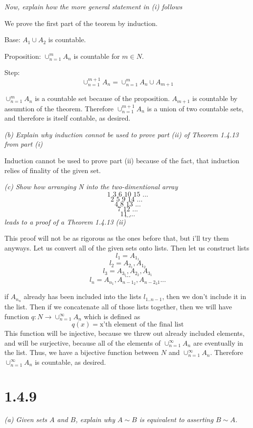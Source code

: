 \documentclass[11pt,oneside,titlepage]{book}
\begin{document}
\textit{Now, explain how the more general statement in (i) follows}

We prove the first part of the teorem by induction.

Base: $A_1 \cup A_2$ is countable.

Proposition: $\cup^{m}_{n = 1}A_n$ is countable for $m \in N$.

Step:
$$\cup^{m + 1}_{n = 1}A_n = \cup^{m}_{n = 1}A_n \cup A_{m + 1}$$

$\cup^{m}_{n = 1}A_n$ is a countable set because of the proposition.
$A_{m + 1}$ is countable by assumtion of the theorem. Therefore
$\cup^{m + 1}_{n = 1}A_n$ is a union of two countable sets, and therefore is
itself contable, as desired.

\textit{(b) Explain why induction connot be used to prove part (ii) of
  Theorem 1.4.13 from part (i)}

Induction cannot be used to prove part (ii) because of the fact, that induction
relies of finality of the given set.

\textit{(c) Show how arranging N into the two-dimentional array }
$$\text{1 3 6 10 15 ...}$$
$$\text{2 5 9 14 ...   }$$
$$\text{4 8 13 ...}$$
$$\text{7 12 ...}$$
$$\text{11 ...}$$
$$...$$
\textit{leads to a proof of a Theorem 1.4.13 (ii)}

This proof will not be as rigorous as the ones before that, but i'll try them
anyways. Let us convert all of the given sets onto lists. Then let us construct
lists
$$l_1 = {A_{1_1}}$$
$$l_2 = {A_{2_1}, A_{1_2}}$$
$$l_3 = {A_{3_1}, A_{2_2}, A_{3_1}}$$
$$...$$
$$l_n = {A_{n_1}, A_{n - 1_{2}}, A_{n - 2_{3}1} ...}$$

if $A_{n_n}$ already has been included into the lists $l_{1..n - 1}$, then we don't
include it in the list.
Then if we concatenate all of those lists together, then we will have function
$q: N \to \cup^{\infty}_{n = 1} A_n$ which is defined as
$$q(x) = \text{x'th element of the final list}$$
This function will be injective, because we threw out already included elements, and
will be surjective, because all of the elements of $\cup^{\infty}_{n = 1} A_n$ are
eventually in the list. Thus, we have a bijective function between $N$ and
$\cup^{\infty}_{n = 1} A_n$. Therefore $\cup^{\infty}_{n = 1} A_n$ is countable, as
desired.

\section*{1.4.9}
\textit{(a) Given sets $A$ and $B$, explain why $A \sim B$ is equivalent to asserting
  $B \sim A$.}
\end{document}
